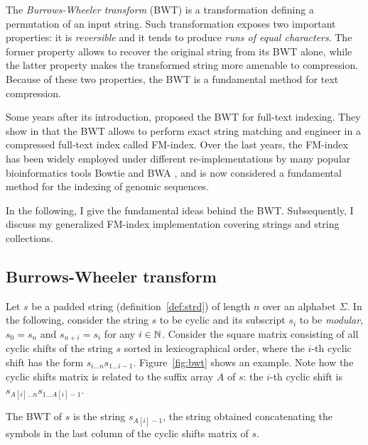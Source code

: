 The \emph{Burrows-Wheeler transform} (BWT) \citep{Burrows1994} is a transformation defining a permutation of an input string.
Such transformation exposes two important properties: it is \emph{reversible} and it tends to produce \emph{runs of equal characters}.
The former property allows to recover the original string from its BWT alone, while the latter property makes the transformed string more amenable to compression.
Because of these two properties, the BWT is a fundamental method for text compression.

Some years after its introduction, \citeauthor{Ferragina2000} proposed the BWT for full-text indexing.
They show in \citep{Ferragina2000} that the BWT allows to perform exact string matching and engineer in \citep{Ferragina2001} a compressed full-text index called FM-index.
Over the last years, the FM-index has been widely employed under different re-implementations by many popular bioinformatics tools \eg Bowtie \citep{Langmead2009} and BWA \citep{Li2009}, and is now considered a fundamental method for the indexing of genomic sequences.

In the following, I give the fundamental ideas behind the BWT.
Subsequently, I discuss my generalized FM-index implementation covering strings and string collections.

\subsection{Burrows-Wheeler transform}
\label{sec:index:bwt}

Let $s$ be a padded string (definition~\ref{def:strd}) of length $n$ over an alphabet $\Sigma$.
In the following, consider the string $s$ to be cyclic and its subscript $s_i$ to be \emph{modular}, \eg $s_0 = s_{n}$ and $s_{n+i} = s_i$ for any $i \in \mathbb {N}$.
Consider the square matrix consisting of all cyclic shifts of the string $s$ sorted in lexicographical order, where the $i$-th cyclic shift has the form $s_{i \dots n} s_{1 \dots i-1}$.
Figure~\ref{fig:bwt} shows an example.
Note how the cyclic shifts matrix is related to the suffix array $A$ of $s$: the $i$-th cyclic shift is $s_{A[i] \dots n} s_{1 \dots A[i]-1}$.

\begin{definition}
\label{def:bwt}
The BWT of $s$ is the string $s_{A[i]-1}$, \ie the string obtained concatenating the symbols in the last column of the cyclic shifts matrix of $s$.
\end{definition}

